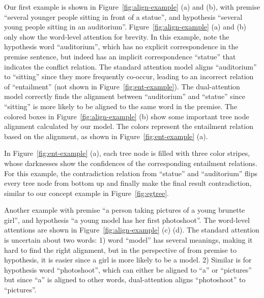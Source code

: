 Our first example is shown in Figure~\ref{fig:align-example} (a) and (b),
with premise ``several younger people sitting in front
of a statue'',
and hypothesis  
``several young people sitting in an auditorium''.
Figure~\ref{fig:align-example} (a) and (b) only show the
word-level attention for brevity.
In this example, note the hypothesis word ``auditorium'',
which has no explicit correspondence in the
premise sentence, but indeed has an implicit correspondence
``statue'' that indicates the conflict relation.
The standard attention model aligns ``auditorium'' to ``sitting''
since they more frequently co-occur,
leading to an incorrect relation of
``entailment'' (not shown in Figure~\ref{fig:ent-example}).
The dual-attention model correctly finds the alignment between
``auditorium'' and ``statue'' since ``sitting'' is more likely
to be aligned to the same word in the premise.
The colored boxes in Figure~\ref{fig:align-example} (b)
show some important tree node alignment calculated by our model. 
The colors
represent the entailment relation based on the alignment,
as shown in Figure~\ref{fig:ent-example} (a).

In Figure~\ref{fig:ent-example} (a), each tree node is filled
with three color stripes, whose darknesses show the confidences
of the corresponding entailment relations.
For this example, the contradiction relation from ``statue''
and ``auditorium'' flips every tree node from bottom up
and finally make the final result contradiction,
similar to our concept example in Figure~\ref{fig:egtree}.

Another example with premise 
``a person taking pictures of a young brunette girl'',
and hypothesis 
``a young model has her first photoshoot''.
The word-level attentions are shown in Figure~\ref{fig:align-example}
(c) (d).
The standard attention is uncertain about two words:
1) word ``model'' has several meanings, making it hard to find 
the right alignment, but
in the perspective of from premise to hypothesis,
it is easier since a girl is more likely to be a model.
2) Similar is for hypothesis word ``photoshoot'',
which can either be aligned to ``a'' or ``pictures''
but since ``a'' is aligned to other words,
dual-attention aligns ``photoshoot'' to ``pictures''.

